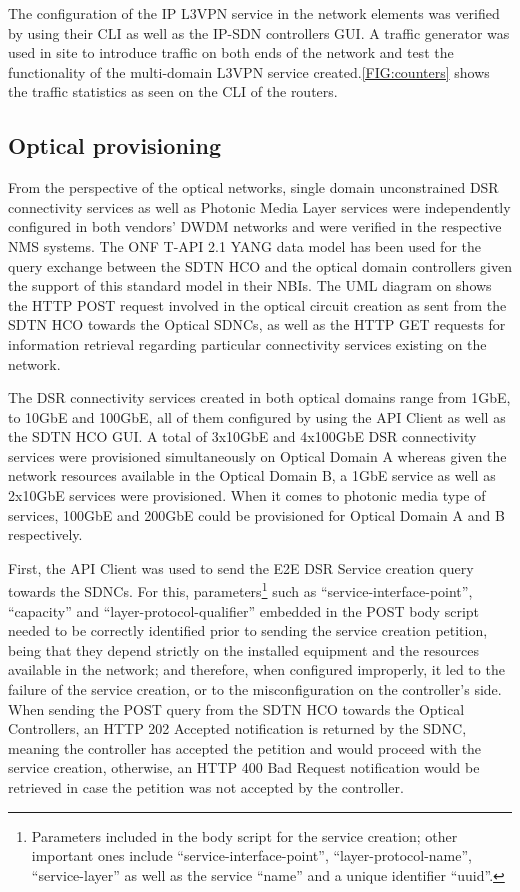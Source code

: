 \documentclass[a4paper,fleqn]{cas-dc}
\begin{document}
The configuration of the IP L3VPN service in the network elements was verified by using their CLI as well as the IP-SDN controllers GUI. A traffic generator was used in site to introduce traffic on both ends of the network and test the functionality of the multi-domain L3VPN service created.\cref{FIG:counters} shows the traffic statistics as seen on the CLI of the routers.

\subsection{Optical provisioning}
From the perspective of the optical networks, single domain unconstrained DSR connectivity services as well as Photonic Media Layer services were independently configured in both vendors’ DWDM networks and were verified in the respective NMS systems. The ONF T-API 2.1 YANG data model has been used for the query exchange between the SDTN HCO and the optical domain controllers given the support of this standard model in their NBIs. The UML diagram on  shows the HTTP POST request involved in the optical circuit creation as sent from the SDTN HCO towards the Optical SDNCs, as well as the HTTP GET requests for information retrieval regarding particular connectivity services existing on the network. 

The DSR connectivity services created in both optical domains range from 1GbE, to 10GbE and 100GbE, all of them configured by using the API Client as well as the SDTN HCO GUI. A total of 3x10GbE and 4x100GbE DSR connectivity services were provisioned simultaneously on Optical Domain A whereas given the network resources available in the Optical Domain B, a 1GbE service as well as 2x10GbE services were provisioned. When it comes to photonic media type of services, 100GbE and 200GbE could be provisioned for Optical Domain A and B respectively. 

First, the API Client was used to send the E2E DSR Service creation query towards the SDNCs. For this, parameters\footnote{Parameters included in the body script for the service creation; other important ones include “service-interface-point”, “layer-protocol-name”, “service-layer” as well as the service “name” and a unique identifier “uuid”.} such as “service-interface-point”, “capacity” and “layer-protocol-qualifier” embedded in the POST body script needed to be correctly identified prior to sending the service creation petition, being that they depend strictly on the installed equipment and the resources available in the network; and therefore, when configured improperly, it led to the failure of the service creation, or to the misconfiguration on the controller’s side. When sending the POST query from the SDTN HCO towards the Optical Controllers, an HTTP 202 Accepted notification is returned by the SDNC, meaning the controller has accepted the petition and would proceed with the service creation, otherwise, an HTTP 400 Bad Request notification would be retrieved in case the petition was not accepted by the controller. 
\end{document}
